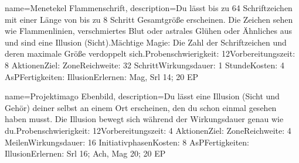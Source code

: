 {
    name={Menetekel Flammenschrift},
    description={Du lässt bis zu 64 Schriftzeichen mit einer Länge von bis zu 8 Schritt Gesamtgröße erscheinen. Die Zeichen sehen wie Flammenlinien, verschmiertes Blut oder astrales Glühen oder Ähnliches aus und sind eine Illusion (Sicht).\newline Mächtige Magie: Die Zahl der Schriftzeichen und deren maximale Größe verdoppelt sich.\newline Probenschwierigkeit: 12\newline Vorbereitungszeit: 8 Aktionen\newline Ziel: Zone\newline Reichweite: 32 Schritt\newline Wirkungsdauer: 1 Stunde\newline Kosten: 4 AsP\newline Fertigkeiten: Illusion\newline Erlernen: Mag, Srl 14; 20 EP}
}


{
    name={Projektimago Ebenbild},
    description={Du lässt eine Illusion (Sicht und Gehör) deiner selbst an einem Ort erscheinen, den du schon einmal gesehen haben musst. Die Illusion bewegt sich während der Wirkungsdauer genau wie du.\newline Probenschwierigkeit: 12\newline Vorbereitungszeit: 4 Aktionen\newline Ziel: Zone\newline Reichweite: 4 Meilen\newline Wirkungsdauer: 16 Initiativphasen\newline Kosten: 8 AsP\newline Fertigkeiten: Illusion\newline Erlernen: Srl 16; Ach, Mag 20; 20 EP}
}


